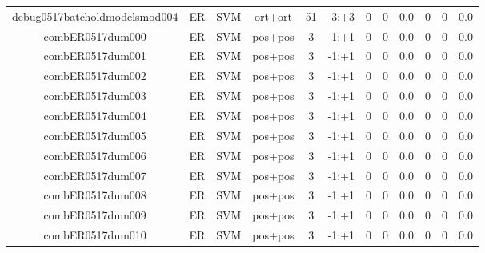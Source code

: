 \documentclass[a4paper]{article}
\begin{document}
\begin{landscape}
\begin{center}
\begin{tabular}{ |c|c|c|c|c|c|c|c|c|c|c|c|}
 
 	
 	\small{ debug0517batcholdmodelsmod004 } & ER & SVM & ort+ort  &  51 &  -3:+3  &  0 & 0 & 0.0  &  0 & 0 & 0.0 \\
 	

 
 	
 	\small{ combER0517dum000 } & ER & SVM & pos+pos  &  3 &  -1:+1  &  0 & 0 & 0.0  &  0 & 0 & 0.0 \\
 	

 
 	
 	\small{ combER0517dum001 } & ER & SVM & pos+pos  &  3 &  -1:+1  &  0 & 0 & 0.0  &  0 & 0 & 0.0 \\
 	

 
 	
 	\small{ combER0517dum002 } & ER & SVM & pos+pos  &  3 &  -1:+1  &  0 & 0 & 0.0  &  0 & 0 & 0.0 \\
 	

 
 	
 	\small{ combER0517dum003 } & ER & SVM & pos+pos  &  3 &  -1:+1  &  0 & 0 & 0.0  &  0 & 0 & 0.0 \\
 	

 
 	
 	\small{ combER0517dum004 } & ER & SVM & pos+pos  &  3 &  -1:+1  &  0 & 0 & 0.0  &  0 & 0 & 0.0 \\
 	

 
 	
 	\small{ combER0517dum005 } & ER & SVM & pos+pos  &  3 &  -1:+1  &  0 & 0 & 0.0  &  0 & 0 & 0.0 \\
 	

 
 	
 	\small{ combER0517dum006 } & ER & SVM & pos+pos  &  3 &  -1:+1  &  0 & 0 & 0.0  &  0 & 0 & 0.0 \\
 	

 
 	
 	\small{ combER0517dum007 } & ER & SVM & pos+pos  &  3 &  -1:+1  &  0 & 0 & 0.0  &  0 & 0 & 0.0 \\
 	

 
 	
 	\small{ combER0517dum008 } & ER & SVM & pos+pos  &  3 &  -1:+1  &  0 & 0 & 0.0  &  0 & 0 & 0.0 \\
 	

 
 	
 	\small{ combER0517dum009 } & ER & SVM & pos+pos  &  3 &  -1:+1  &  0 & 0 & 0.0  &  0 & 0 & 0.0 \\
 	

 
 	
 	\small{ combER0517dum010 } & ER & SVM & pos+pos  &  3 &  -1:+1  &  0 & 0 & 0.0  &  0 & 0 & 0.0 \\
 	


\end{tabular}
\end{center}
\end{landscape}
\end{document}
